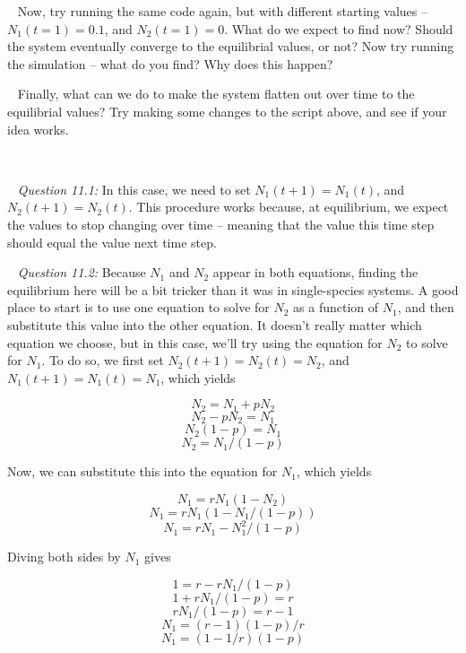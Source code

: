 \documentclass[12pt]{article}
\begin{document}
~\newline
{}
\newline
Now, try running the same code again, but with different starting values -- $N_1(t = 1) = 0.1$, and $N_2(t = 1) = 0$. What do we expect to find now? Should the system eventually converge to the equilibrial values, or not? Now try running the simulation -- what do you find? Why does this happen?

~\newline
{}
\newline
Finally, what can we do to make the system flatten out over time to the equilibrial values? Try making some changes to the script above, and see if your idea works.

~\newline

\pagebreak
{}

~\newline
\textit{Question 11.1:}
\newline
In this case, we need to set $N_1(t+1) = N_1(t)$, and $N_2(t+1) = N_2(t)$. This procedure works because, at equilibrium, we expect the values to stop changing over time -- meaning that the value this time step should equal the value next time step.

~\newline
\textit{Question 11.2:}
\newline
Because $N_1$ and $N_2$ appear in both equations, finding the equilibrium here will be a bit tricker than it was in single-species systems. A good place to start is to use one equation to solve for $N_2$ as a function of $N_1$, and then substitute this value into the other equation. It doesn't really matter which equation we choose, but in this case, we'll try using the equation for $N_2$ to solve for $N_1$. To do so, we first set $N_2(t+1) = N_2(t) = N_2$, and $N_1(t+1) = N_1(t) = N_1$, which yields

$$ N_2 = N_1 + p N_2 $$
$$ N_2 - p N_2 = N_1 $$
$$ N_2(1 - p) = N_1 $$
$$ N_2 = N_1/(1 - p) $$

Now, we can substitute this into the equation for $N_1$, which yields

$$ N_1 = r N_1(1-N_2) $$
$$ N_1 = r N_1(1-N_1/(1 - p)) $$
$$ N_1 = r N_1-N_1^2/(1 - p) $$

Diving both sides by $N_1$ gives

$$ 1 = r - r N_1/(1 - p) $$
$$ 1 + r N_1/(1 - p) = r $$
$$ r N_1/(1 - p) = r - 1 $$
$$ N_1 = (r - 1)(1 - p)/r $$
$$ N_1 = (1 - 1/r)(1 - p) $$
\end{document}
